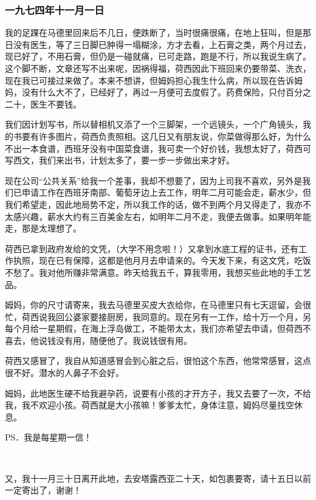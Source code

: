 \subsubsection{一九七四年十一月一日}

\par {}
\par 我的足踝在马德里回来后不几日，便跌断了，当时很痛很痛，在地上狂叫，但是那日没有医生，等了三日脚已肿得一塌糊涂，方才去看，上石膏之类，两个月过去，现已好了，不用石膏，但仍是一碰就痛，已可走路，跑是不行，所以我说生病了。这个脚不断，文章还写不出来呢，因祸得福，荷西因此下班回来仍要带菜、洗衣，现在我已可接过来做了。本来不想讲，但姆妈担心我生什么病，所以现在告诉姆妈，没有什么大不了，已经好了，再过一月便可去度假了。药费保险，只付百分之二十，医生不要钱。
\par 我们因计划写书，所以替相机又添了一个三脚架，一个远镜头，一个广角镜头，我的书要有许多图片，荷西负责照相。这几日又有朋友说，你菜做得那么好，为什么不出一本食谱，西班牙没有中国菜食谱，我可卖一个好价钱，我想太好了，荷西可写西文，我们来出书，计划太多了，要一步一步做出来才好。
\par 现在公司“公共关系”给我一个差事，我却不想要了，因为上司我不喜欢，另外是我们已申请工作在西班牙南部、葡萄牙边上去工作，明年二月可能会走，薪水少，但我们希望走，因此地局势不定，所以我工作的话，做不到两个月又得走了，我亦不太感兴趣，薪水大约有三百美金左右，如明年二月不走，我便去做事。如果明年能走，那是太理想了。
\par 荷西已拿到政府发给的文凭，（大学不用念啦！）又拿到水底工程的证书，还有工作执照，现在已有保障，这都是他月月去申请来的。今天发下来，有这文凭，吃饭不愁了。我对他所赚非常满意。昨天给我五千，算我零用，我想买些此地的手工艺品。
\par 姆妈，你的尺寸请寄来，我去马德里买皮大衣给你，在马德里只有七天逗留，会很忙，荷西说我回公婆家要接厨房，我同意的。现在另有一工作，给十万一个月，另每个月给一星期假，在海上浮岛做工，不能带太太，我们亦希望去申请，但荷西不喜去，他说钱没有用，随便他了。我说钱很有用。
\par 荷西又感冒了，我自从知道感冒会到心脏之后，很怕这个东西，他常常感冒，这点很不好。潜水的人鼻子不会好。
\par 姆妈，此地医生硬不给我避孕药，说要有小孩的才开方子，我又去要了一次，不给我，我不欢迎小孩。荷西就是大小孩嘛！爹爹太忙，身体注意，姆妈尽量找空休息。
\par PS．我是每星期一信！
\par  
\par 又，我十一月三十日离开此地，去安塔露西亚二十天，如包裹要寄，请十五日以前一定寄出了，谢谢！
\par {}

